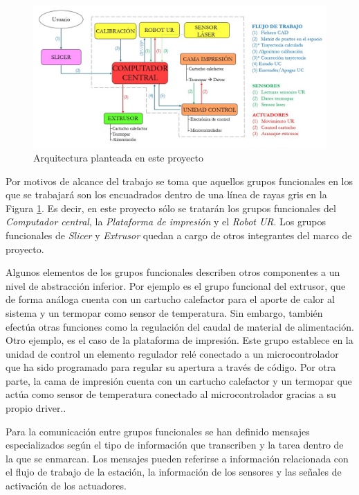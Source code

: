 \begin{figure}[h!]
    \centering
    \includegraphics[scale=0.55]{figuras/arquitectura_TFM_v3.jpg}
    \caption{Arquitectura planteada en este proyecto}
    \label{fig:arquitectura_TFM}
\end{figure}

Por motivos de alcance del trabajo se toma que aquellos grupos funcionales en los que se trabajará son los encuadrados dentro de una línea de rayas gris en la Figura \ref{fig:arquitectura_TFM}. Es decir, en este proyecto sólo se tratarán los grupos funcionales del \textit{Computador central}, la \textit{Plataforma de impresión} y el \textit{Robot UR}. Los grupos funcionales de \textit{Slicer} y \textit{Extrusor} quedan a cargo de otros integrantes del marco de proyecto. 

Algunos elementos de los grupos funcionales describen otros componentes a un nivel de abstracción inferior. Por ejemplo es el grupo funcional del extrusor, que de forma análoga cuenta con un cartucho calefactor para el aporte de calor al sistema y un termopar como sensor de temperatura. Sin embargo, también efectúa otras funciones como la regulación del caudal de material de alimentación. Otro ejemplo, es el caso de la plataforma de impresión. Este grupo establece en la unidad de control un elemento regulador relé conectado a un microcontrolador que ha sido programado para regular su apertura a través de código. Por otra parte, la cama de impresión cuenta con un cartucho calefactor y un termopar que actúa como sensor de temperatura conectado al microcontrolador gracias a su propio driver..

Para la comunicación entre grupos funcionales se han definido mensajes especializados según el tipo de información que transcriben y la tarea dentro de la que se enmarcan. Los mensajes pueden referirse a información relacionada con el flujo de trabajo de la estación, la información de los sensores y las señales de activación de los actuadores.

